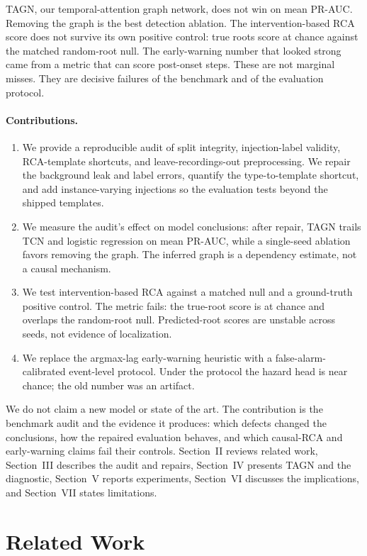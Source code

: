 \documentclass[conference]{IEEEtran}
\begin{document}
TAGN, our temporal-attention graph network, does not win on mean PR-AUC. Removing the graph is the best detection ablation. The intervention-based RCA score does not survive its own positive control: true roots score at chance against the matched random-root null. The early-warning number that looked strong came from a metric that can score post-onset steps. These are not marginal misses. They are decisive failures of the benchmark and of the evaluation protocol.

\paragraph{Contributions.}
\begin{enumerate}
\item We provide a reproducible audit of split integrity, injection-label validity, RCA-template shortcuts, and leave-recordings-out preprocessing. We repair the background leak and label errors, quantify the type-to-template shortcut, and add instance-varying injections so the evaluation tests beyond the shipped templates.
\item We measure the audit's effect on model conclusions: after repair, TAGN trails TCN and logistic regression on mean PR-AUC, while a single-seed ablation favors removing the graph. The inferred graph is a dependency estimate, not a causal mechanism.
\item We test intervention-based RCA against a matched null and a ground-truth positive control. The metric fails: the true-root score is at chance and overlaps the random-root null. Predicted-root scores are unstable across seeds, not evidence of localization.
\item We replace the argmax-lag early-warning heuristic with a false-alarm-calibrated event-level protocol. Under the protocol the hazard head is near chance; the old number was an artifact.
\end{enumerate}

We do not claim a new model or state of the art. The contribution is the benchmark audit and the evidence it produces: which defects changed the conclusions, how the repaired evaluation behaves, and which causal-RCA and early-warning claims fail their controls. Section~II reviews related work, Section~III describes the audit and repairs, Section~IV presents TAGN and the diagnostic, Section~V reports experiments, Section~VI discusses the implications, and Section~VII states limitations.

\section{Related Work}
\end{document}
